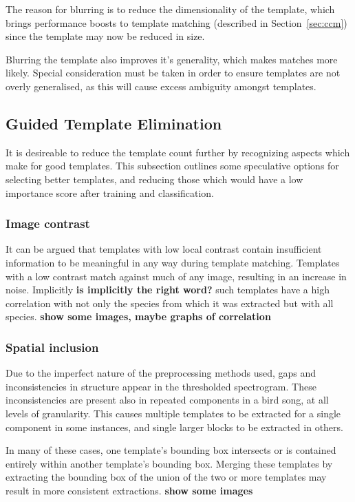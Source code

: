 The reason for blurring is to reduce the dimensionality of the template, which
brings performance boosts to template matching (described in
Section~\ref{sec:ccm}) since the template may now be reduced in size.

Blurring the template also improves it's generality, which makes matches more
likely.
Special consideration must be taken in order to ensure templates are not overly
generalised, as this will cause excess ambiguity amongst templates.



\subsection{Guided Template Elimination}
It is desireable to reduce the template count further by recognizing aspects which
make for good templates. This subsection outlines some speculative options for
selecting better templates, and reducing those which would have a low importance
score after training and classification.

\subsubsection{Image contrast}
It can be argued that templates with low local contrast contain insufficient
information to be meaningful in any way during template matching.
Templates with a low contrast match against much of any image, resulting in an
increase in noise.
Implicitly \textbf{is implicitly the right word?} such templates have a high
correlation with not only the species from which it was extracted but with all
species.
\textbf{show some images, maybe graphs of correlation}

\subsubsection{Spatial inclusion}
Due to the imperfect nature of the preprocessing methods used, gaps and
inconsistencies in structure appear in the thresholded spectrogram.
These inconsistencies are present also in repeated components in a bird song,
at all levels of granularity.
This causes multiple templates to be extracted for a single component in some
instances, and single larger blocks to be extracted in others.

In many of these cases, one template's bounding box intersects or is contained
entirely within another template's bounding box.
Merging these templates by extracting the bounding box of the union of the two
or more templates may result in more consistent extractions.
\textbf{show some images}

